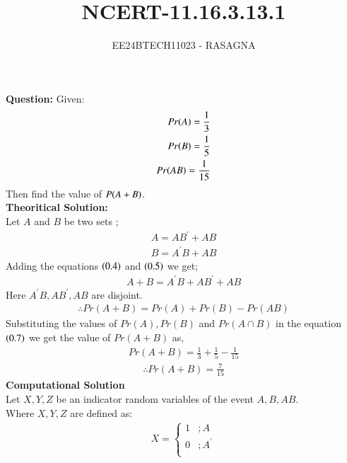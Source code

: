 \documentclass[journal]{IEEEtran}
\begin{document}

\vspace{3cm}

\title{NCERT-11.16.3.13.1}
\author{EE24BTECH11023 - RASAGNA}
{\let\newpage\relax\maketitle}
\renewcommand{\thefigure}{\theenumi}
\renewcommand{\thetable}{\theenumi}
\setlength{\intextsep}{10pt} %
\renewcommand{\thetable}{\theenumi}
\textbf{Question:}
Given:\\
\begin{align}
Pr{\left(A\right)}=\frac{1}{3}\\
Pr{\left(B\right)}=\frac{1}{5}\\
Pr{\left(AB\right)}=\frac{1}{15}
\end{align}
Then find the value of $P{\left(A+B\right)}$.\\
\textbf{Theoritical Solution:}\\
Let $A$ and $B$ be two sets ;
\begin{align}
    A=AB^{'}+AB\\
    B=A^{'}B+AB
\end{align}
Adding the equations $\left(0.4\right)$ and $\left(0.5\right)$ we get;
\begin{align}
    A+B=A^{'}B+AB^{'}+AB
\end{align}
Here $A^{'}B,AB^{'},AB$ are disjoint.
\begin{align}
    \therefore Pr(A+B)=Pr(A)+Pr(B)-Pr(AB)
\end{align}
Substituting the values of $Pr(A),Pr(B)$ and $Pr(A \cap B)$ in the equation $\left(0.7\right)$ we get the value of $Pr(A+B)$ as,
\begin{align}
    Pr(A+B)=\frac{1}{3}+\frac{1}{5}-\frac{1}{15}
\end{align}
\begin{align}
    \therefore Pr(A + B)=\frac{7}{15}
\end{align}
\textbf{Computational Solution}\\
Let $X,Y,Z$ be an indicator random variables of the event $A,B,AB$.\\
Where $X,Y,Z$ are defined as:
\begin{align}
	X =
	\begin{cases}
		1 &; A\\
		0 &; A^{'}\\
	\end{cases}
\end{align}
\end{document}
